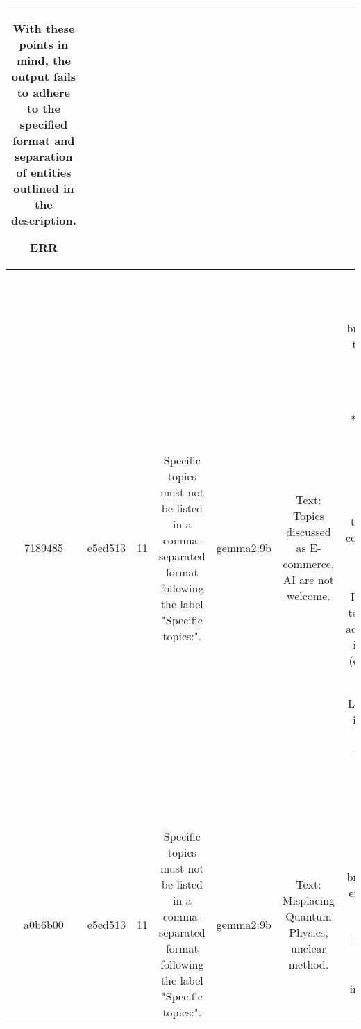 \begin{table}[h!]
\begin{tabular}{|c|c|c|c|c|c|c|c|c|c|}
With these points in mind, the output fails to adhere to the specified format and separation of entities outlined in the description.

ERR & \\
\hline
7189485 & e5ed513 & 11 & Specific topics must not be listed in a comma-separated format following the label "Specific topics:". & gemma2:9b & Text: Topics discussed as E-commerce, AI are not welcome. & Here's a breakdown of the entities from your provided text:

**Company names:** 

**People names:** 

**Specific topics:**  E-commerce, AI

**General themes:**  Rejection of technological advancements in business (e-commerce and AI).


Let me know if you have any other text you'd like me to analyze! 
 & err & The chatbot's output has a few issues with compliance based on the description provided. 

The description specifies that the output must follow the format:

Company names: <comma_separated_list_of_company_names>
People names: -||-
Specific topics: -||-
General themes: -||-

The output does follow this format to an extent; however, 'Company names:' and 'People names:' are both empty lists, which could potentially be a compliance issue if such items were supposed to exist in the input text, but since we cannot verify this without the input text, we cannot consider their absence as a violation.

Furthermore, in the "Specific topics" and "General themes", the chatbot provided specific content without a comma-separated list and period ending each item. While the presence of content cannot be judged, it does not comply with the description's prescribed format exactly. Specific topics should be a comma-separated list, and general themes should be similarly formatted and do not exactly follow the required period punctuation.

Therefore, the output does not precisely adhere to the prescribed response format specified in the description.

ERR & \\
\hline
a0b6b00 & e5ed513 & 11 & Specific topics must not be listed in a comma-separated format following the label "Specific topics:". & gemma2:9b & Text: Misplacing Quantum Physics, unclear method. & Here's a breakdown of entities from the text provided, keeping in mind the limited information:


\end{tabular}
\end{table}
